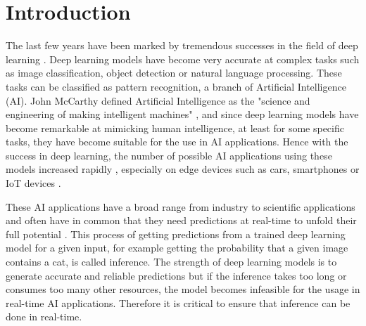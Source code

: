 \chapter{Introduction}

The last few years have been marked by tremendous successes in the field of deep learning \cite{DBLP:journals/corr/abs-1807-08169,DBLP:journals/corr/abs-1806-08894}.
Deep learning models have become very accurate at complex tasks such as image classification, object detection or natural language processing. 
These tasks can be classified as pattern recognition, a branch of Artificial Intelligence (AI).
John McCarthy defined Artificial Intelligence as the "science and engineering of making intelligent machines" \cite{AI}, and since deep learning models have become remarkable at mimicking human intelligence, at least for some specific tasks, they have become suitable for the use in AI applications.
Hence with the success in deep learning, the number of possible AI applications using these models increased rapidly \cite{inproceedings, breadth}, especially on edge devices such as cars, smartphones or IoT devices \cite{futureMLtiny, MovingToEdge}.

These AI applications have a broad range from industry to scientific applications and often have in common that they need predictions at real-time to unfold their full potential \cite{DBLP:journals/corr/NishiharaMWTPSL17, DBLP:journals/corr/CrankshawBGLZFGJ14}.
This process of getting predictions from a trained deep learning model for a given input, for example getting the probability that a given image contains a cat, is called inference.
The strength of deep learning models is to generate accurate and reliable predictions but if the inference takes too long or consumes too many other resources, the model becomes infeasible for the usage in real-time AI applications.
Therefore it is critical to ensure that inference can be done in real-time.

